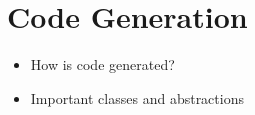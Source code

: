 \section{Code Generation}
\begin{itemize}
    \item How is code generated?
    \item Important classes and abstractions
\end{itemize}